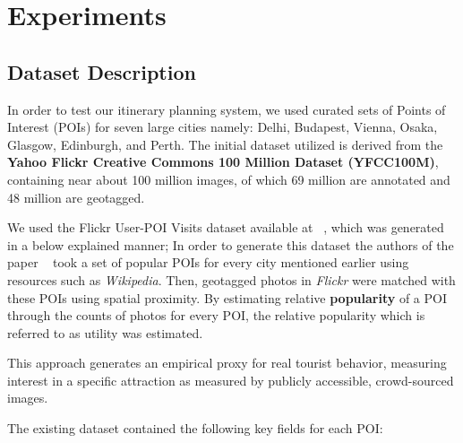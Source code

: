 \section{Experiments}

\subsection{Dataset Description}
In order to test our itinerary planning system, we used curated sets of Points of Interest (POIs) for seven large cities namely: Delhi, Budapest, Vienna, Osaka, Glasgow, Edinburgh, and Perth. The initial dataset utilized is derived from the \textbf{Yahoo Flickr Creative Commons 100 Million Dataset (YFCC100M)}, containing near about 100 million images, of which 69 million are annotated and 48 million are geotagged.

We used the Flickr User-POI Visits dataset available at ~\cite{limkwanhuiDataCode}, which was generated in a below explained manner; In order to generate this dataset the authors of the paper ~\cite{taylor2018tour} took a set of popular POIs for every city mentioned earlier using resources such as \textit{Wikipedia}. Then, geotagged photos in \textit{Flickr} were matched with these POIs using spatial proximity. By estimating relative \textbf{popularity} of a POI through the counts of photos for every POI, the relative popularity which is referred to as utility was estimated.

This approach generates an empirical proxy for real tourist behavior, measuring interest in a specific attraction as measured by publicly accessible, crowd-sourced images.

The existing dataset contained the following key fields for each POI:

